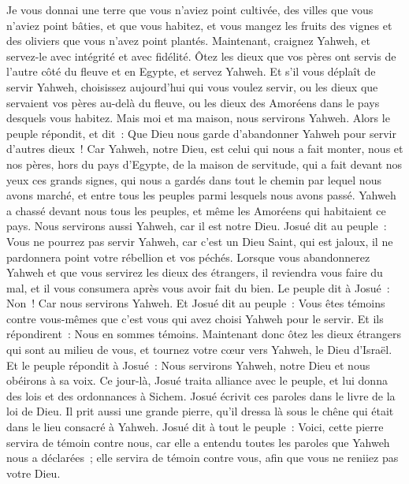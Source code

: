 \begin{multicols}{2}
Je vous donnai une terre que vous n'aviez point cultivée, des villes que vous n'aviez point bâties, et que vous habitez, et vous mangez les fruits des vignes et des oliviers que vous n'avez point plantés.
Maintenant, craignez Yahweh, et servez-le avec intégrité et avec fidélité. Ôtez les dieux que vos pères ont servis de l'autre côté du fleuve et en Egypte, et servez Yahweh.
Et s'il vous déplaît de servir Yahweh, choisissez aujourd'hui qui vous voulez servir, ou les dieux que servaient vos pères au-delà du fleuve, ou les dieux des Amoréens dans le pays desquels vous habitez. Mais moi et ma maison, nous servirons Yahweh.
Alors le peuple répondit, et dit~: Que Dieu nous garde d'abandonner Yahweh pour servir d'autres dieux~!
Car Yahweh, notre Dieu, est celui qui nous a fait monter, nous et nos pères, hors du pays d'Egypte, de la maison de servitude, qui a fait devant nos yeux ces grands signes, qui nous a gardés dans tout le chemin par lequel nous avons marché, et entre tous les peuples parmi lesquels nous avons passé.
Yahweh a chassé devant nous tous les peuples, et même les Amoréens qui habitaient ce pays. Nous servirons aussi Yahweh, car il est notre Dieu.
Josué dit au peuple~: Vous ne pourrez pas servir Yahweh, car c'est un Dieu Saint, qui est jaloux, il ne pardonnera point votre rébellion et vos péchés.
Lorsque vous abandonnerez Yahweh et que vous servirez les dieux des étrangers, il reviendra vous faire du mal, et il vous consumera après vous avoir fait du bien.
Le peuple dit à Josué~: Non~! Car nous servirons Yahweh.
Et Josué dit au peuple~: Vous êtes témoins contre vous-mêmes que c'est vous qui avez choisi Yahweh pour le servir. Et ils répondirent~: Nous en sommes témoins.
Maintenant donc ôtez les dieux étrangers qui sont au milieu de vous, et tournez votre cœur vers Yahweh, le Dieu d'Israël.
Et le peuple répondit à Josué~: Nous servirons Yahweh, notre Dieu et nous obéirons à sa voix.
Ce jour-là, Josué traita alliance avec le peuple, et lui donna des lois et des ordonnances à Sichem.
Josué écrivit ces paroles dans le livre de la loi de Dieu. Il prit aussi une grande pierre, qu'il dressa là sous le chêne qui était dans le lieu consacré à Yahweh.
Josué dit à tout le peuple~: Voici, cette pierre servira de témoin contre nous, car elle a entendu toutes les paroles que Yahweh nous a déclarées~; elle servira de témoin contre vous, afin que vous ne reniiez pas votre Dieu.

\end{multicols}
